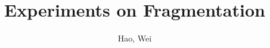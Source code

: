 \documentclass{article}
\begin{document}
\title{Experiments on Fragmentation}
\author{Hao, Wei}
\maketitle
\newpage

\tableofcontents
\newpage





\begin{appendix}  





 
\end{appendix} 
\end{document}
